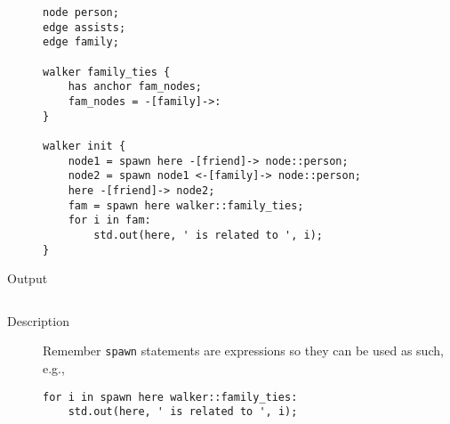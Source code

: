 \begin{description}
    \begin{lstlisting}[caption={Getting returned values from spawned walkers}]
node person;
edge assists;
edge family;

walker family_ties {
    has anchor fam_nodes;
    fam_nodes = -[family]->:
}

walker init {
    node1 = spawn here -[friend]-> node::person;
    node2 = spawn node1 <-[family]-> node::person;
    here -[friend]-> node2;
    fam = spawn here walker::family_ties;
    for i in fam:
        std.out(here, ' is related to ', i);
}
    \end{lstlisting}
    \item[Output] \texttt{}
          \begin{lstlisting}[language=shell]
        \end{lstlisting}
    \item[Description] \texttt{}
          \begin{remark}
              \begin{tBox}
                  Remember \texttt{spawn} statements are expressions so they can be used as such, e.g.,
                  \begin{lstlisting}
for i in spawn here walker::family_ties:
    std.out(here, ' is related to ', i);
        \end{lstlisting}
              \end{tBox}
          \end{remark}
\end{description}

